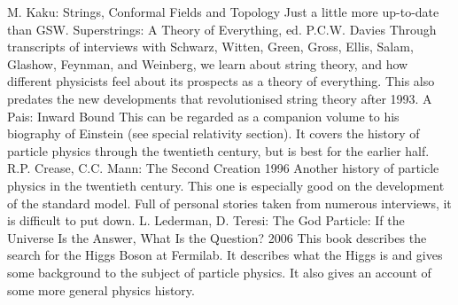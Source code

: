 \documentclass[10pt,a4paper]{book}
\theoremstyle{definition}
\begin{document}
M. Kaku: Strings, Conformal Fields and Topology
Just a little more up-to-date than GSW.
Superstrings: A Theory of Everything, ed. P.C.W. Davies
Through transcripts of interviews with Schwarz, Witten, Green, Gross, Ellis, Salam, Glashow, Feynman, and Weinberg, we learn about string theory, and how different physicists feel about its prospects as a theory of everything.  This also predates the new developments that revolutionised string theory after 1993.
A Pais: Inward Bound
This can be regarded as a companion volume to his biography of Einstein (see special relativity section).  It covers the history of particle physics through the twentieth century, but is best for the earlier half.
R.P. Crease, C.C. Mann: The Second Creation 1996
Another history of particle physics in the twentieth century.  This one is especially good on the development of the standard model.  Full of personal stories taken from numerous interviews, it is difficult to put down.
L. Lederman, D. Teresi: The God Particle: If the Universe Is the Answer, What Is the Question? 2006
This book describes the search for the Higgs Boson at Fermilab.  It describes what the Higgs is and gives some background to the subject of particle physics.  It also gives an account of some more general physics history.
\end{document}
